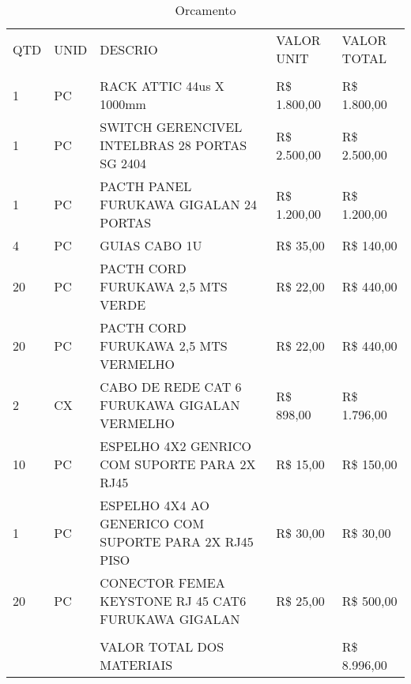 \begin{table}[h!]
\centering
\caption{Orcamento}
\label{Orcamento}
\begin{tabular}{lllll}
QTD & UNID & DESCRIO                                               & VALOR UNIT   & VALOR TOTAL  \\
    &      &                                                       &              &              \\
1   & PC   & RACK ATTIC 44us X 1000mm                              & R\$ 1.800,00 & R\$ 1.800,00 \\
1   & PC   & SWITCH GERENCIVEL INTELBRAS 28 PORTAS SG 2404         & R\$ 2.500,00 & R\$ 2.500,00 \\
1   & PC   & PACTH PANEL FURUKAWA GIGALAN 24 PORTAS                & R\$ 1.200,00 & R\$ 1.200,00 \\
4   & PC   & GUIAS CABO 1U                                         & R\$ 35,00    & R\$ 140,00   \\
20  & PC   & PACTH CORD FURUKAWA 2,5 MTS VERDE                     & R\$ 22,00    & R\$ 440,00   \\
20  & PC   & PACTH CORD FURUKAWA 2,5 MTS VERMELHO                  & R\$ 22,00    & R\$ 440,00   \\
2   & CX   & CABO DE REDE CAT 6 FURUKAWA GIGALAN VERMELHO          & R\$ 898,00   & R\$ 1.796,00 \\
10  & PC   & ESPELHO 4X2 GENRICO COM SUPORTE PARA 2X RJ45          & R\$ 15,00    & R\$ 150,00   \\
1   & PC   & ESPELHO 4X4 AO GENERICO COM SUPORTE PARA 2X RJ45 PISO & R\$ 30,00    & R\$ 30,00    \\
20  & PC   & CONECTOR FEMEA KEYSTONE RJ 45 CAT6 FURUKAWA GIGALAN   & R\$ 25,00    & R\$ 500,00   \\
    &      &                                                       &              &              \\
    &      & VALOR TOTAL DOS MATERIAIS                             &              & R\$ 8.996,00
\end{tabular}
\end{table}